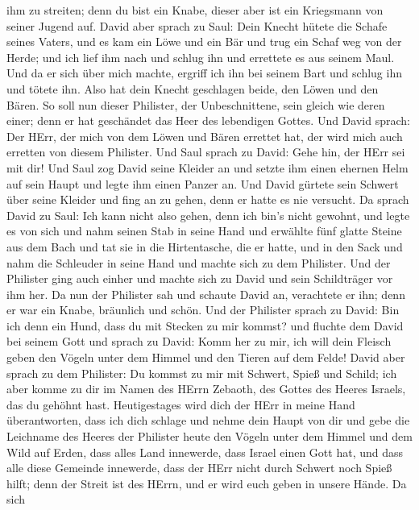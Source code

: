 ihm zu streiten; denn du bist ein Knabe, dieser aber ist ein Kriegsmann
von seiner Jugend auf.  David aber sprach zu Saul: Dein
Knecht hütete die Schafe seines Vaters, und es kam ein Löwe und ein Bär
und trug ein Schaf weg von der Herde;  und ich lief ihm
nach und schlug ihn und errettete es aus seinem Maul. Und da er sich
über mich machte, ergriff ich ihn bei seinem Bart und schlug ihn und
tötete ihn.  Also hat dein Knecht geschlagen beide, den
Löwen und den Bären. So soll nun dieser Philister, der Unbeschnittene,
sein gleich wie deren einer; denn er hat geschändet das Heer des
lebendigen Gottes.  Und David sprach: Der HErr, der mich
von dem Löwen und Bären errettet hat, der wird mich auch erretten von
diesem Philister.  Und Saul sprach zu David: Gehe hin, der
HErr sei mit dir! Und Saul zog David seine Kleider an und setzte ihm
einen ehernen Helm auf sein Haupt und legte ihm einen Panzer an.
 Und David gürtete sein Schwert über seine Kleider und fing
an zu gehen, denn er hatte es nie versucht. Da sprach David zu Saul: Ich
kann nicht also gehen, denn ich bin's nicht gewohnt, und legte es von
sich  und nahm seinen Stab in seine Hand und erwählte fünf
glatte Steine aus dem Bach und tat sie in die Hirtentasche, die er
hatte, und in den Sack und nahm die Schleuder in seine Hand und machte
sich zu dem Philister.  Und der Philister ging auch einher
und machte sich zu David und sein Schildträger vor ihm her.
 Da nun der Philister sah und schaute David an, verachtete
er ihn; denn er war ein Knabe, bräunlich und schön.  Und
der Philister sprach zu David: Bin ich denn ein Hund, dass du mit
Stecken zu mir kommst? und fluchte dem David bei seinem Gott
 und sprach zu David: Komm her zu mir, ich will dein
Fleisch geben den Vögeln unter dem Himmel und den Tieren auf dem Felde!
 David aber sprach zu dem Philister: Du kommst zu mir mit
Schwert, Spieß und Schild; ich aber komme zu dir im Namen des HErrn
Zebaoth, des Gottes des Heeres Israels, das du gehöhnt hast.
 Heutigestages wird dich der HErr in meine Hand
überantworten, dass ich dich schlage und nehme dein Haupt von dir und
gebe die Leichname des Heeres der Philister heute den Vögeln unter dem
Himmel und dem Wild auf Erden, dass alles Land innewerde, dass Israel
einen Gott hat,  und dass alle diese Gemeinde innewerde,
dass der HErr nicht durch Schwert noch Spieß hilft; denn der Streit ist
des HErrn, und er wird euch geben in unsere Hände.  Da sich
